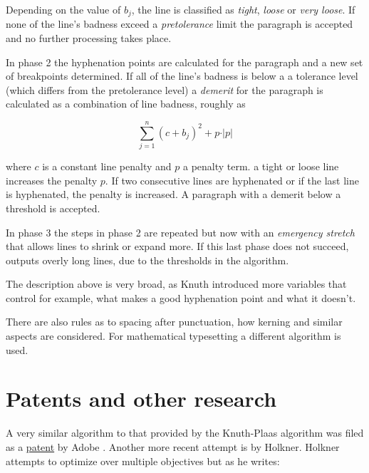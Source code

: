 {{\begin{description}
Depending on the value of $b_j$, the line is classified as \textit{tight}, \textit{loose} or  \textit{very loose}. If none of the line's badness exceed a \textit{pretolerance}  limit the paragraph is accepted and no further processing takes place.

\item[Phase 2] In phase 2 the hyphenation points are calculated for the paragraph and a new set of breakpoints  determined. If all of the line's badness is below a a tolerance level  (which differs from the pretolerance level) a \textit{demerit} for the paragraph is calculated as a combination of line badness, roughly as

\begin{equation}
\sum_{j=1}^{n}  \left(c+b_j \right)^{2} + p \cdot \vert p\vert 
\end{equation}

where $c$ is a constant line penalty and $p$ a penalty term. a tight or loose line increases the penalty $p$. If two consecutive lines are hyphenated or if the last line is hyphenated, the penalty is increased. A paragraph with a demerit below a threshold is accepted.

\item[Phase 3] In phase 3 the steps in phase 2 are repeated but now with an \textit{emergency stretch} that allows lines to shrink or expand more. If this last phase does not succeed, \tex outputs overly long lines, due to the thresholds in the algorithm.
\end{description}

The description above is very broad, as Knuth introduced more variables that control for example, what makes a good hyphenation point and what it doesn’t.

There are also rules as to spacing after punctuation, how kerning and similar aspects are considered.  For mathematical typesetting a different algorithm is used. 


\section{Patents and other research}

A very similar algorithm to that provided by the Knuth-Plaas algorithm was filed as a \href{http://www.freepatentsonline.com/6510441.pdf}{patent}
by Adobe \cite{adobepatent}. Another more recent attempt is by Holkner\cite{Holkner2006}. Holkner attempts to optimize over multiple objectives but as he writes:

}}
